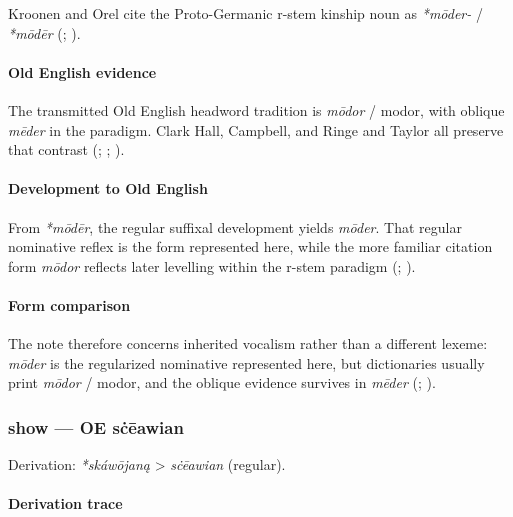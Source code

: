 \documentclass[
  british,
  a4paper,
]{article}
\begin{document}
Kroonen and Orel cite the Proto-Germanic r-stem kinship noun as
\emph{*mōder-} / \emph{*mōdēr} (; ).

\paragraph{Old English evidence}\label{old-english-evidence-9}

The transmitted Old English headword tradition is \emph{mōdor} / modor,
with oblique \emph{mēder} in the paradigm. Clark Hall, Campbell, and
Ringe and Taylor all preserve that contrast
(;
;
).

\paragraph{Development to Old
English}\label{development-to-old-english-9}

From \emph{*mōdēr}, the regular suffixal development yields
\emph{mōder}. That regular nominative reflex is the form represented
here, while the more familiar citation form \emph{mōdor} reflects later
levelling within the r-stem paradigm
(;
).

\paragraph{Form comparison}\label{form-comparison-2}

The note therefore concerns inherited vocalism rather than a different
lexeme: \emph{mōder} is the regularized nominative represented here, but
dictionaries usually print \emph{mōdor} / modor, and the oblique
evidence survives in \emph{mēder} (; ).

\subsubsection{show --- OE sċēawian}\label{show-oe-sux10bux113awian}

Derivation: \emph{*skáwōjaną} \textgreater{} \emph{sċēawian} (regular).

\paragraph{Derivation trace}\label{derivation-trace-10}
\end{document}
